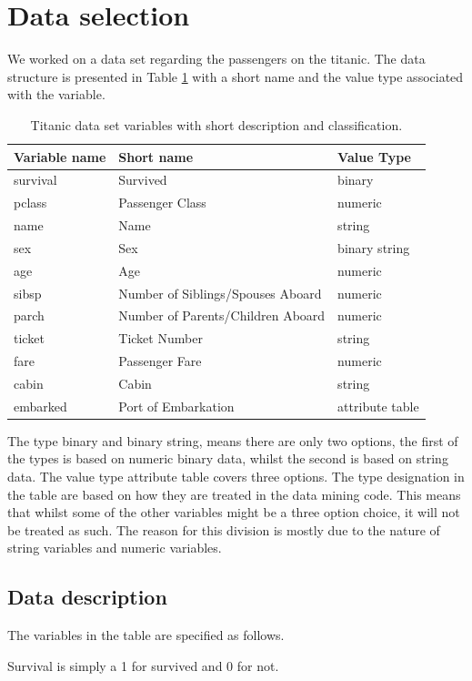 \documentclass[a4paper,11pt]{article}
\begin{document}
\section{Data selection}
We worked on a data set regarding the passengers on the titanic. The data structure is presented in Table \ref{titanData} with a short name and the value type associated with the variable.
\begin{table}[h]
\begin{tabular}{|l|l|l|}
\hline
Variable name & Short name & Value Type\\
\hline
survival & Survived & binary\\
pclass & Passenger Class & numeric\\
name & Name & string\\
sex & Sex & binary string\\
age & Age & numeric\\
sibsp & Number of Siblings/Spouses Aboard & numeric\\
parch & Number of Parents/Children Aboard & numeric\\
ticket & Ticket Number & string\\
fare & Passenger Fare & numeric\\
cabin & Cabin & string\\
embarked & Port of Embarkation & attribute table\\
\hline
\end{tabular}
\caption{Titanic data set variables with short description and classification.}
\label{titanData}
\end{table}

The type binary and binary string, means there are only two options, the first of the types is based on numeric binary data, whilst the second is based on string data. The value type attribute table covers three options. The type designation in the table are based on how they are treated in the data mining code. This means that whilst some of the other variables might be a three option choice, it will not be treated as such. The reason for this division is mostly due to the nature of string variables and numeric variables.

\subsection{Data description}
The variables in the table are specified as follows. 

Survival is simply a 1 for survived and 0 for not. 
\end{document}
